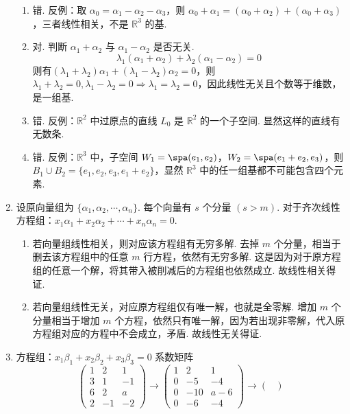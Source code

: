 \begin{enumerate}
\begin{enumerate}
        \item 错. 反例：取 $\alpha_0=\alpha_1-\alpha_2-\alpha_3$，则 $\alpha_0+\alpha_1=(\alpha_0+\alpha_2)+(\alpha_0+\alpha_3)$，三者线性相关，不是 $\mathbb R^3$ 的基.
        \item 对. 判断 $\alpha_1+\alpha_2$ 与 $\alpha_1-\alpha_2$ 是否无关.
        \[\lambda_1(\alpha_1+\alpha_2)+\lambda_2(\alpha_1-\alpha_2)=0\]
        则有$(\lambda_1+\lambda_2)\alpha_1+(\lambda_1-\lambda_2)\alpha_2=0$，则 $\lambda_1+\lambda_2=0,\lambda_1-\lambda_2=0\Rightarrow \lambda_1=\lambda_2=0$，因此线性无关且个数等于维数，是一组基.
        \item 错. 反例：$\mathbb R^2$ 中过原点的直线 $L_0$ 是 $\mathbb R^2$ 的一个子空间. 显然这样的直线有无数条.
        \item 错. 反例：$\mathbb R^3$ 中，子空间 $W_1=\spa(e_1,e_2)$，$W_2=\spa(e_1+e_2,e_3)$，则 $B_1\cup B_2=\{e_1,e_2,e_3,e_1+e_2\}$，显然 $\mathbb R^3$ 中的任一组基都不可能包含四个元素.
    \end{enumerate}
    \item 设原向量组为 $\{\alpha_1,\alpha_2,\cdots,\alpha_n\}$. 每个向量有 $s$ 个分量 $(s>m)$. 对于齐次线性方程组：$x_1\alpha_1+x_2\alpha_2+\cdots+x_n\alpha_n=0$.
	\begin{enumerate}
        \item 若向量组线性相关，则对应该方程组有无穷多解. 去掉 $m$ 个分量，相当于删去该方程组中的任意 $m$ 行方程，依然有无穷多解. 这是因为对于原方程组的任意一个解，将其带入被削减后的方程组也依然成立. 故线性相关得证.
        \item 若向量组线性无关，对应原方程组仅有唯一解，也就是全零解. 增加 $m$ 个分量相当于增加 $m$ 个方程，依然只有唯一解，因为若出现非零解，代入原方程组对应的方程中不会成立，矛盾. 故线性无关得证.
    \end{enumerate}
	\item 方程组：$x_1\beta_1+x_2\beta_2+x_3\beta_3=0$ 系数矩阵
    \[\begin{pmatrix}
		1 & 2 & 1\\
		3 & 1 & -1\\
		6 & 2 & a\\
		2 & -1 &
		-2\end{pmatrix}\rightarrow\begin{pmatrix}
		1 & 2 & 1\\
		0 & -5 & -4\\
		0 & -10 & a-6\\
		0 & -6 &-4
	\end{pmatrix}\rightarrow\begin{pmatrix}

\end{pmatrix}\]
\end{enumerate}
